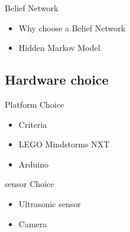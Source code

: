 \begin{frame}{Belief Network}
\begin{itemize}
 \item Why choose a Belief Network
 \item Hidden Markov Model
\end{itemize}
\end{frame}

\subsection{Hardware choice}
\begin{frame}{Platform Choice}
\begin{itemize}
 \item Criteria
 \item LEGO Mindstorms NXT
 \item Arduino
\end{itemize}
\end{frame}

\begin{frame}{sensor Choice}
\begin{itemize}
 \item Ultrasonic sensor
 \item Camera
\end{itemize}
\end{frame}
 
